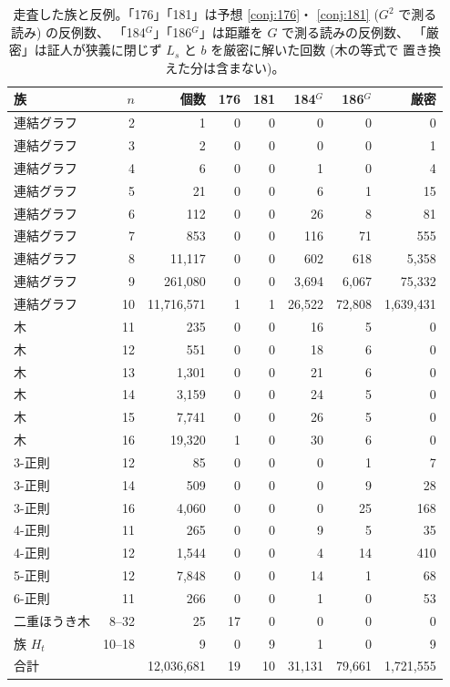 \documentclass[paper=a4,fontsize=10.5pt,jafontsize=10.5pt]{jlreq}
\theoremstyle{plain}
\theoremstyle{definition}
\begin{document}
\begin{table}[htbp]
\centering
\small
\caption{走査した族と反例。「176」「181」は予想 \ref{conj:176}・
\ref{conj:181} ($G^2$ で測る読み) の反例数、
「184${}^{G}$」「186${}^{G}$」は距離を $G$ で測る読みの反例数、
「厳密」は証人が狭義に閉じず $L_s$ と $b$ を厳密に解いた回数 (木の等式で
置き換えた分は含まない)。}
\label{tab:fams}
\begin{tabular}{lrrrrrrr}
\toprule
族 & $n$ & 個数 & 176 & 181 & 184${}^{G}$ & 186${}^{G}$ & 厳密 \\
\midrule
連結グラフ & 2 & 1 & 0 & 0 & 0 & 0 & 0 \\
連結グラフ & 3 & 2 & 0 & 0 & 0 & 0 & 1 \\
連結グラフ & 4 & 6 & 0 & 0 & 1 & 0 & 4 \\
連結グラフ & 5 & 21 & 0 & 0 & 6 & 1 & 15 \\
連結グラフ & 6 & 112 & 0 & 0 & 26 & 8 & 81 \\
連結グラフ & 7 & 853 & 0 & 0 & 116 & 71 & 555 \\
連結グラフ & 8 & 11,117 & 0 & 0 & 602 & 618 & 5,358 \\
連結グラフ & 9 & 261,080 & 0 & 0 & 3,694 & 6,067 & 75,332 \\
連結グラフ & 10 & 11,716,571 & 1 & 1 & 26,522 & 72,808 & 1,639,431 \\
木 & 11 & 235 & 0 & 0 & 16 & 5 & 0 \\
木 & 12 & 551 & 0 & 0 & 18 & 6 & 0 \\
木 & 13 & 1,301 & 0 & 0 & 21 & 6 & 0 \\
木 & 14 & 3,159 & 0 & 0 & 24 & 5 & 0 \\
木 & 15 & 7,741 & 0 & 0 & 26 & 5 & 0 \\
木 & 16 & 19,320 & 1 & 0 & 30 & 6 & 0 \\
3-正則 & 12 & 85 & 0 & 0 & 0 & 1 & 7 \\
3-正則 & 14 & 509 & 0 & 0 & 0 & 9 & 28 \\
3-正則 & 16 & 4,060 & 0 & 0 & 0 & 25 & 168 \\
4-正則 & 11 & 265 & 0 & 0 & 9 & 5 & 35 \\
4-正則 & 12 & 1,544 & 0 & 0 & 4 & 14 & 410 \\
5-正則 & 12 & 7,848 & 0 & 0 & 14 & 1 & 68 \\
6-正則 & 11 & 266 & 0 & 0 & 1 & 0 & 53 \\
二重ほうき木 & 8--32 & 25 & 17 & 0 & 0 & 0 & 0 \\
族 $H_t$ & 10--18 & 9 & 0 & 9 & 1 & 0 & 9 \\
\midrule
\multicolumn{2}{l}{合計} & 12,036,681 & 19 & 10
& 31,131 & 79,661 & 1,721,555 \\
\bottomrule
\end{tabular}
\end{table}
\end{document}
